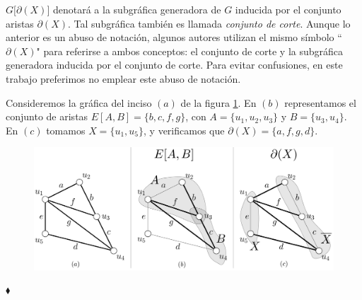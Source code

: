 $G\Big[\partial(X)\Big]$ denotará a la subgráfica generadora de $G$ inducida por el conjunto aristas $\partial(X)$. Tal subgráfica también es llamada \textit{conjunto de corte}. Aunque lo anterior es un abuso de notación, algunos autores utilizan el mismo símbolo ``$\partial(X)$"\:\!\! para referirse a ambos conceptos: el conjunto de corte y la subgráfica generadora inducida por el conjunto de corte. Para evitar confusiones, en este trabajo preferimos no emplear este abuso de notación.


\begin{ejem} \label{ejem:cjtosdecorte}
Consideremos la gráfica del inciso $(a)$ de la figura \ref{fig:cjtosdecorte}. En $(b)$ representamos el conjunto de aristas $E[A,B] = \{b,c,f,g\}$, con $A=\{u_{1}, u_{2}, u_{3}\}$ y $B=\{u_{3},u_{4}\}$. En $(c)$ tomamos $X =\{u_{1},u_{5}\}$, y verificamos que $\partial(X) = \{a,f,g,d\}$.
\begin{figure}[H]
    \centering
    \includegraphics[scale=0.24]{img/imgchapter2/cjtosdecorte.jpg}
    \caption{}
    \label{fig:cjtosdecorte}
\end{figure}

\hfill $\blacklozenge$
\end{ejem}

